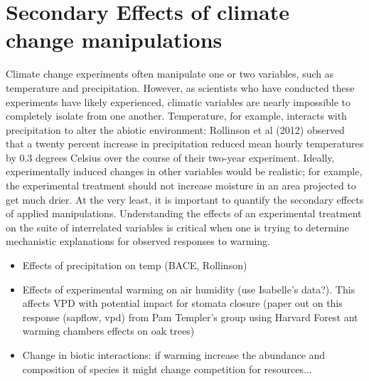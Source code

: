 \documentclass{article}
\begin{document}
\section {Secondary Effects of climate change manipulations}
Climate change experiments often manipulate one or two variables, such as temperature and precipitation. However, as scientists who have conducted these experiments have likely experienced, climatic variables are nearly impossible to completely isolate from one another.  Temperature, for example, interacts with precipitation to alter the abiotic environment: Rollinson et al (2012) observed that a twenty percent increase in precipitation reduced mean hourly temperatures by 0.3 degrees Celsius over the course of their two-year experiment. Ideally, experimentally induced changes in other variables would be realistic; for example, the experimental treatment should not increase moisture in an area projected to get much drier. At the very least, it is important to quantify the secondary effects of applied manipulations.  Understanding the effects of an experimental treatment on the suite of interrelated variables is critical when one is trying to determine mechanistic explanations for observed responses to warming.
\begin{itemize}
\item Effects of precipitation on temp (BACE, Rollinson)

\item Effects of experimental warming on air humidity (use Isabelle's data?). This affects VPD with potential impact for stomata closure (paper out on this response (sapflow, vpd) from Pam Templer's group using Harvard Forest ant warming chambers effects on oak trees)
\item Change in biotic interactions: if warming increase the abundance and composition of species it might change competition for resources...
\end{itemize}
\end{document}

